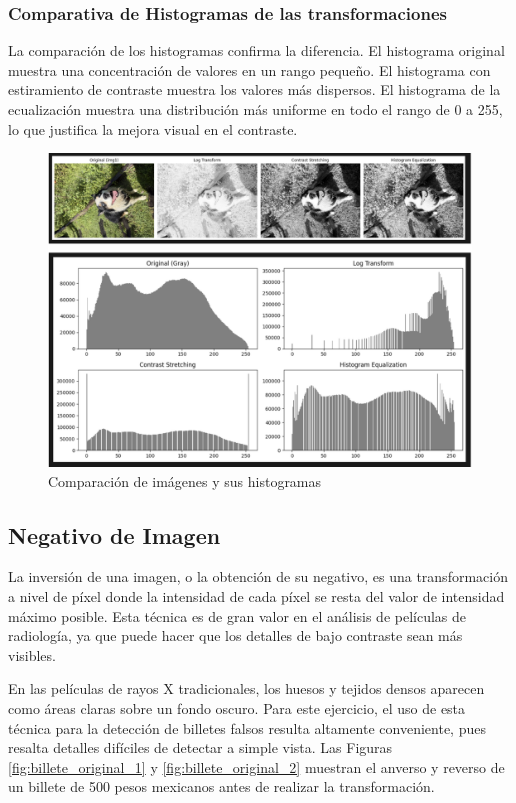 \documentclass[12pt,letterpaper]{article}
\begin{document}
\subsubsection{Comparativa de Histogramas de las transformaciones}

La comparación de los histogramas confirma la diferencia. El histograma original muestra una concentración de valores en un rango pequeño. El histograma con estiramiento de contraste muestra los valores más dispersos. El histograma de la ecualización muestra una distribución más uniforme en todo el rango de 0 a 255, lo que justifica la mejora visual en el contraste.

\begin{figure}[H]
  \centering
  \includegraphics[width=0.8\linewidth]{figuras/comparacion_transformaciones.png}
  \caption{Comparación de imágenes y sus histogramas}
  \label{fig:comparacion_transformaciones}
\end{figure}

\subsection{Negativo de Imagen}

La inversión de una imagen, o la obtención de su negativo, es una transformación a nivel de píxel donde la intensidad de cada píxel se resta del valor de intensidad máximo posible. Esta técnica es de gran valor en el análisis de películas de radiología, ya que puede hacer que los detalles de bajo contraste sean más visibles.

En las películas de rayos X tradicionales, los huesos y tejidos densos aparecen como áreas claras sobre un fondo oscuro. Para este ejercicio, el uso de esta técnica para la detección de billetes falsos resulta altamente conveniente, pues resalta detalles difíciles de detectar a simple vista. Las Figuras \ref{fig:billete_original_1} y \ref{fig:billete_original_2} muestran el anverso y reverso de un billete de 500 pesos mexicanos antes de realizar la transformación.
\end{document}
